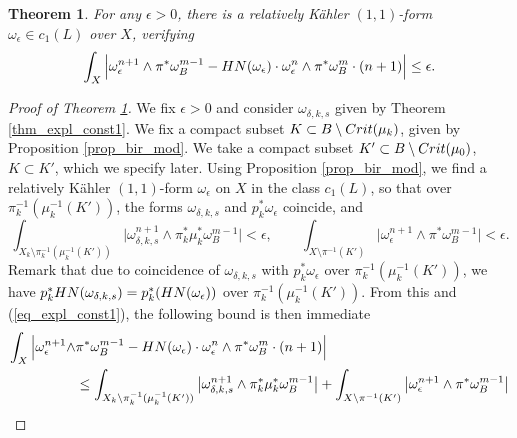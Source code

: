 \documentclass[10pt,a4paper]{amsart}
\newtheorem{thm}{Theorem}
\begin{document}
	\begin{thm}\label{thm_main2}
		For any $\epsilon > 0$, there is a relatively Kähler $(1,1)$-form $\omega_{\epsilon} \in c_1(L)$ over $X$, verifying 
		\begin{equation}\label{eq_thm_main2}
			\int_X
			\Big|
			\omega_{\epsilon}^{n + 1} \wedge \pi^* \omega_B^{m - 1}
			-
			{\rm{HN}}(\omega_{\epsilon}) \cdot \omega_{\epsilon}^n \wedge \pi^* \omega_B^m \cdot (n + 1)
			\Big|
			\leq
			\epsilon.
		\end{equation}
	\end{thm}

	\begin{proof}[Proof of Theorem \ref{thm_main2}]
		We fix $\epsilon > 0$ and consider $\omega_{\delta, k, s}$ given by Theorem \ref{thm_expl_const1}.
		We fix a compact subset $K \subset B \setminus {\rm{Crit}}(\mu_k)$, given by Proposition \ref{prop_bir_mod}.
		We take a compact subset $K' \subset B \setminus {\rm{Crit}}(\mu_0)$, $K \subset K'$, which we specify later.
		Using Proposition \ref{prop_bir_mod}, we find a relatively Kähler $(1, 1)$-form $\omega_{\epsilon}$ on $X$ in the class $c_1(L)$, so that over $\pi_k^{-1} (\mu_k^{-1}(K'))$, the forms $\omega_{\delta, k, s}$ and $p_k^* \omega_{\epsilon}$ coincide, and
		\begin{equation}\label{eq_eps_away_from_soln}
			\int_{X_k \setminus \pi_k^{-1} (\mu_k^{-1}(K'))} \big| \omega_{\delta, k, s}^{n + 1} \wedge \pi_k^* \mu_k^* \omega_B^{m - 1} \big| < \epsilon, 
			\qquad 
			\int_{X \setminus \pi^{-1} (K')} \big| \omega_{\epsilon}^{n + 1} \wedge \pi^* \omega_B^{m - 1} \big| < \epsilon.
		\end{equation}
		Remark that due to coincidence of $\omega_{\delta, k, s}$ with $p_k^* \omega_{\epsilon}$ over $\pi_k^{-1} (\mu_k^{-1}(K'))$, we have $p_k^* {\rm{HN}}(\omega_{\delta, k, s}) = p_k^*( {\rm{HN}}(\omega_{\epsilon}))$ over $\pi_k^{-1} (\mu_k^{-1}(K'))$.
		From this and (\ref{eq_expl_const1}), the following bound is then immediate 
		\begin{equation}\label{eq_eps_away_from_soln2}
		\begin{aligned}
			\int_{X}
			\Big|
			\omega_{\epsilon}^{n + 1} \wedge & \pi^* \omega_B^{m - 1}
			-
			{\rm{HN}}(\omega_{\epsilon}) \cdot \omega_{\epsilon}^n \wedge  \pi^* \omega_B^m \cdot (n + 1)
			\Big|
			\\
			&
			\leq
			\int_{X_k \setminus \pi_k^{-1} (\mu_k^{-1}(K'))} \big| \omega_{\delta, k, s}^{n + 1} \wedge \pi_k^* \mu_k^* \omega_B^{m - 1} \big|
			+
			\int_{X \setminus \pi^{-1} (K')} \big| \omega_{\epsilon}^{n + 1} \wedge \pi^* \omega_B^{m - 1} \big|

\end{aligned}
\end{equation}
\end{proof}
\end{document}
